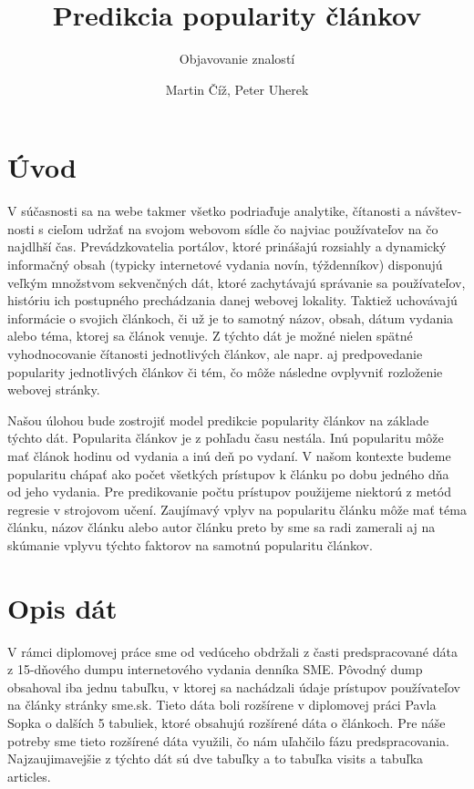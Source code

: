 \documentclass[runningheads,a4paper]{llncs}
\begin{document}
\title{Predikcia popularity článkov}
\subtitle{Objavovanie znalostí}
\author{Martin Číž, Peter Uherek}
\maketitle


\section{Úvod}
V súčasnosti sa na webe takmer všetko podriaďuje analytike, čítanosti a 
návštev-nosti s cieľom udržať na svojom webovom sídle čo najviac používateľov na 
čo najdlhší čas. Prevádzkovatelia portálov, ktoré prinášajú rozsiahly a 
dynamický informačný obsah (typicky internetové vydania novín, týždenníkov) 
disponujú veľkým množstvom sekvenčných dát, ktoré zachytávajú správanie sa 
používateľov, históriu ich postupného prechádzania danej webovej lokality. 
Taktiež uchovávajú informácie o svojich článkoch, či už je to samotný názov, 
obsah, dátum vydania alebo téma, ktorej sa článok venuje. Z týchto dát je možné 
nielen spätné vyhodnocovanie čítanosti jednotlivých článkov, ale napr. aj 
predpovedanie popularity jednotlivých článkov či tém, čo môže následne ovplyvniť 
rozloženie webovej stránky. 

Našou úlohou bude zostrojiť model predikcie popularity článkov na základe týchto dát. Popularita článkov je z pohľadu času nestála. Inú popularitu môže mať článok hodinu od vydania a inú deň po vydaní. V našom kontexte budeme popularitu chápať ako počet všetkých prístupov k článku po dobu jedného dňa od jeho vydania. Pre predikovanie počtu prístupov použijeme niektorú z metód regresie v strojovom učení. Zaujímavý vplyv na popularitu článku môže mať téma článku, názov článku alebo autor článku preto by sme sa radi zamerali aj na skúmanie vplyvu týchto faktorov na samotnú popularitu článkov.

\section{Opis dát}
V rámci diplomovej práce sme od vedúceho obdržali z časti predspracované dáta z 15-dňového dumpu internetového vydania denníka SME. Pôvodný dump obsahoval iba jednu tabuľku, v ktorej sa nachádzali údaje prístupov používateľov na články stránky sme.sk. Tieto dáta boli rozšírene v diplomovej práci Pavla Sopka \cite{diplomovka} o dalších 5 tabuliek, ktoré obsahujú rozšírené dáta o článkoch. Pre náše potreby sme tieto rozšírené dáta využili, čo nám uľahčilo fázu predspracovania. Najzaujimavejšie z týchto dát sú dve tabuľky a to tabuľka visits a tabuľka articles.
\end{document}
